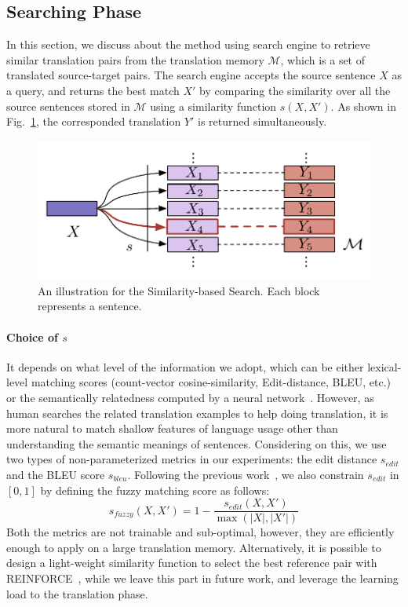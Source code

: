\documentclass[11pt,letterpaper]{article}
\begin{document}
\subsection{Searching Phase}
In this section, we discuss about the method using search engine to retrieve similar translation pairs from the translation memory $\mathcal{M}$, which is a set of translated source-target pairs. The search engine accepts the source sentence $X$ as a query, and returns the best match $X'$ by comparing the similarity over all the source sentences stored in $\mathcal{M}$ using a similarity function $s(X, X')$. As shown in Fig.~\ref{fig.search}, the corresponded translation $Y'$ is returned simultaneously.
\begin{figure}[htbp]
\centering
\vspace{-8pt}
\includegraphics[width=0.85\linewidth]{figures/search.pdf}
\vspace{-5pt}
\caption{\label{fig.search}An illustration for the Similarity-based Search. Each block represents a sentence.}
\vspace{-8pt}
\end{figure}
\paragraph{Choice of $s$}
It depends on what level of the information we adopt, which can be either lexical-level matching scores (count-vector cosine-similarity, Edit-distance, BLEU, etc.) or the semantically relatedness computed by a neural network~\cite{hu2014convolutional}. However, as human searches the related translation examples to help doing translation, it is more natural to match shallow features of language usage other than understanding the semantic meanings of sentences. Considering on this, we use two types of non-parameterized metrics in our experiments: the edit distance $s_{edit}$ and the BLEU score $s_{bleu}$. Following the previous work~\cite{li2016phrase}, we also constrain $s_{edit}$ in $[0, 1]$ by defining the fuzzy matching score as follows:
\begin{equation}
s_{fuzzy}(X, X') = 1 - \frac{s_{edit}(X, X')}{\max\left(|X|, |X'|\right)}
\end{equation}
Both the metrics are not trainable and sub-optimal, however, they are efficiently enough to apply on a large translation memory. 
Alternatively, it is possible to design a light-weight similarity function to select the best reference pair with REINFORCE~\cite{williams1992simple}, while we leave this part in future work, and leverage the learning load to the translation phase.
\end{document}
